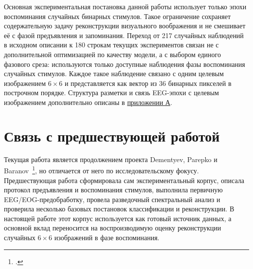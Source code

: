 Основная экспериментальная постановка данной работы использует только эпохи
воспоминания случайных бинарных стимулов. Такое ограничение сохраняет
содержательную задачу реконструкции визуального воображения и не смешивает её с фазой
предъявления и запоминания. Переход от 217 случайных наблюдений в исходном
описании к 180 строкам текущих экспериментов связан не с дополнительной
оптимизацией по качеству модели, а с выбором единого фазового среза:
используются только доступные наблюдения фазы воспоминания случайных
стимулов. Каждое такое наблюдение связано с одним целевым изображением
$6 \times 6$ и представляется как вектор из 36 бинарных пикселей в построчном
порядке. Структура разметки и связь EEG-эпохи с целевым изображением
дополнительно описаны в \hyperref[app:dataset]{приложении А}.

\section{Связь с предшествующей работой}

Текущая работа является продолжением проекта Dementyev, Parepko и
Baranov~\footcite{dementyev2025visualstimuli}, но отличается от него по
исследовательскому фокусу. Предшествующая работа сформировала сам
экспериментальный корпус, описала протокол предъявления и воспоминания
стимулов, выполнила первичную EEG/EOG-предобработку, провела разведочный
спектральный анализ и проверила несколько базовых постановок классификации и
реконструкции. В настоящей работе этот корпус используется как готовый
источник данных, а основной вклад переносится на воспроизводимую оценку
реконструкции случайных $6 \times 6$ изображений в фазе воспоминания.

